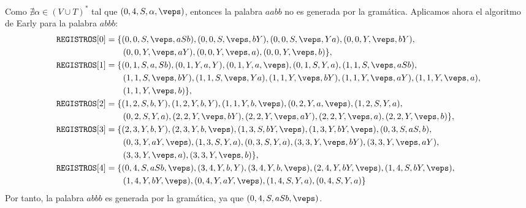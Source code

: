 \documentclass[12pt]{article}
\begin{document}
\begin{ejercicio}[2.5 puntos]
        Como $\nexists \alpha\in (V\cup T)^*$ tal que $(0,4,S,\alpha,\veps)$, entonces la palabra $aabb$ no es generada por la gramática.
        Aplicamos ahora el algoritmo de Early para la palabra $abbb$:
        \begin{align*}
            \texttt{REGISTROS}[0] &= \{(0,0,S,\veps,aSb),(0,0,S,\veps,bY),(0,0,S,\veps,Ya), (0,0,Y,\veps,bY),\\&\qquad (0,0,Y,\veps,aY),(0,0,Y,\veps,a),(0,0,Y,\veps,b)\}, \\
            \texttt{REGISTROS}[1] &= \{(0,1,S,a,Sb),(0,1,Y,a,Y), (0,1,Y,a,\veps),(0,1,S,Y,a),(1,1,S,\veps,aSb),\\&\qquad (1,1,S,\veps,bY),(1,1,S,\veps,Ya),(1,1,Y,\veps,bY),(1,1,Y,\veps,aY),(1,1,Y,\veps,a),\\&\qquad (1,1,Y,\veps,b)\}, \\
            \texttt{REGISTROS}[2] &= \{(1,2,S,b,Y),(1,2,Y,b,Y),(1,1,Y,b,\veps),(0,2,Y,a,\veps),(1,2,S,Y,a),\\&\qquad (0,2,S,Y,a),(2,2,Y,\veps,bY),(2,2,Y,\veps,aY),(2,2,Y,\veps,a),(2,2,Y,\veps,b)\}, \\
            \texttt{REGISTROS}[3] &= \{(2,3,Y,b,Y), (2,3,Y,b,\veps),(1,3,S,bY,\veps),(1,3,Y,bY,\veps),(0,3,S,aS,b),\\&\qquad(0,3,Y,aY,\veps),(1,3,S,Y,a),(0,3,S,Y,a), (3,3,Y,\veps,bY),(3,3,Y,\veps,aY),\\&\qquad(3,3,Y,\veps,a),(3,3,Y,\veps,b)\}, \\
            \texttt{REGISTROS}[4] &= \{(0,4,S,aSb,\veps),(3,4,Y,b,Y), (3,4,Y,b,\veps),(2,4,Y,bY,\veps),(1,4,S,bY,\veps),\\&\qquad(1,4,Y,bY,\veps),(0,4,Y,aY,\veps),(1,4,S,Y,a),(0,4,S,Y,a)\}
        \end{align*}
        Por tanto, la palabra $abbb$ es generada por la gramática, ya que $(0,4,S,aSb,\veps)$.
    \end{ejercicio}
\end{document}
